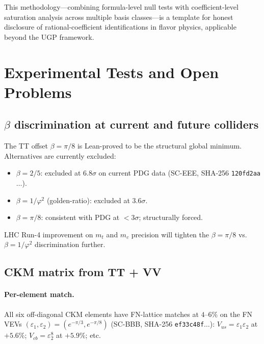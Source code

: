 \documentclass[11pt]{article}
\theoremstyle{remark}
\begin{document}
This methodology---combining formula-level null tests with coefficient-level
saturation analysis across multiple basis classes---is a template for honest
disclosure of rational-coefficient identifications in flavor physics, applicable
beyond the UGP framework.

\section{Experimental Tests and Open Problems}
\label{sec:experimental}

\subsection{$\beta$ discrimination at current and future colliders}
\label{sec:beta_disc}

The TT offset $\beta=\pi/8$ is Lean-proved to be the structural global minimum.
Alternatives are currently excluded:
\begin{itemize}
  \item $\beta = 2/5$: excluded at $6.8\sigma$ on current PDG data (SC-EEE,
    SHA-256 \texttt{120fd2aa}$\ldots$).
  \item $\beta = 1/\varphi^2$ (golden-ratio): excluded at $3.6\sigma$.
  \item $\beta = \pi/8$: consistent with PDG at $< 3\sigma$; structurally forced.
\end{itemize}
LHC Run-4 improvement on $m_t$ and $m_c$ precision will tighten the
$\beta=\pi/8$ vs.\ $\beta=1/\varphi^2$ discrimination further.

\subsection{CKM matrix from TT + VV}
\label{sec:ckm}

\paragraph{Per-element match.}
All six off-diagonal CKM elements have FN-lattice matches at $4$--$6\%$
on the FN VEVs $(\varepsilon_1,\varepsilon_2)=(e^{-\pi/3},e^{-\pi/8})$
(SC-BBB, SHA-256 \texttt{ef33c48f}$\ldots$):
$V_{us} = \varepsilon_1\varepsilon_2$ at $+5.6\%$;
$V_{cb} = \varepsilon_2^8$ at $+5.9\%$; etc.
\end{document}
